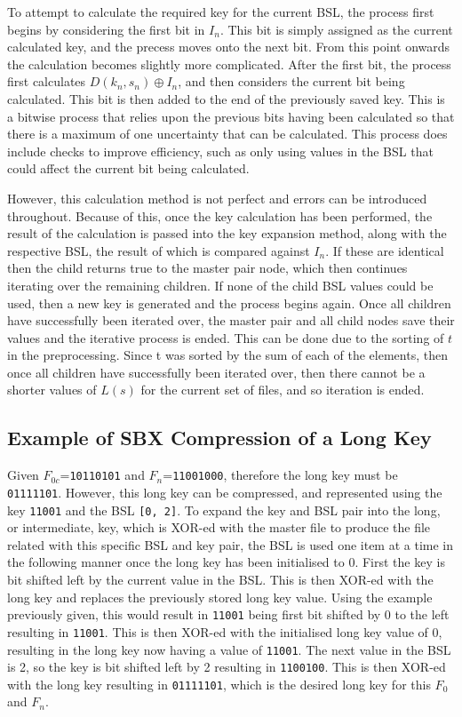 \documentclass{hehe}
\begin{document}
To attempt to calculate the required key for the current BSL, the process first begins by considering the first bit in $I_n$. This bit is simply assigned as the current calculated key, and the precess moves onto the next bit. From this point onwards the calculation becomes slightly more complicated. After the first bit, the process first calculates $D(k_n, s_n) \oplus I_n$, and then considers the current bit being calculated. This bit is then added to the end of the previously saved key. This is a bitwise process that relies upon the previous bits having been calculated so that there is a maximum of one uncertainty that can be calculated. This process does include checks to improve efficiency, such as only using values in the BSL that could affect the current bit being calculated.

However, this calculation method is not perfect and errors can be introduced throughout. Because of this, once the key calculation has been performed, the result of the calculation is passed into the key expansion method, along with the respective BSL, the result of which is compared against $I_n$. If these are identical then the child returns true to the master pair node, which then continues iterating over the remaining children. If none of the child BSL values could be used, then a new key is generated and the process begins again. Once all children have successfully been iterated over, the master pair and all child nodes save their values and the iterative process is ended. This can be done due to the sorting of $t$ in the preprocessing. Since t was sorted by the sum of each of the elements, then once all children have successfully been iterated over, then there cannot be a shorter values of $L(s)$ for the current set of files, and so iteration is ended.

\subsection{Example of SBX Compression of a Long Key}

Given $F_{0c}$=\texttt{10110101} and $F_n$=\texttt{11001000}, therefore the long key must be \texttt{01111101}. However, this long key can be compressed, and represented using the key \texttt{11001} and the BSL \texttt{[0, 2]}. To expand the key and BSL pair into the long, or intermediate, key, which is XOR-ed with the master file to produce the file related with this specific BSL and key pair, the BSL is used one item at a time in the following manner once the long key has been initialised to 0. First the key is bit shifted left by the current value in the BSL. This is then XOR-ed with the long key and replaces the previously stored long key value. Using the example previously given, this would result in \texttt{11001} being first bit shifted by 0 to the left resulting in \texttt{11001}. This is then XOR-ed with the initialised long key value of 0, resulting in the long key now having a value of \texttt{11001}. The next value in the BSL is 2, so the key is bit shifted left by 2 resulting in \texttt{1100100}. This is then XOR-ed with the long key resulting in \texttt{01111101}, which is the desired long key for this $F_0$ and $F_n$.
\end{document}
